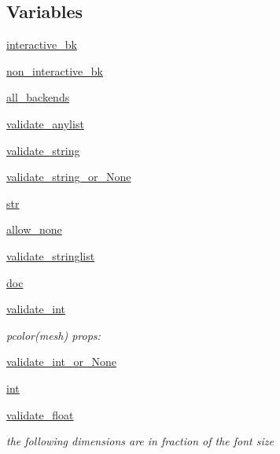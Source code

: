 \subsection*{Variables}
\begin{DoxyCompactItemize}
\item 
\hyperlink{namespacematplotlib_1_1rcsetup_a00b02203e6b65f28d853ecb08f8fc22e}{interactive\+\_\+bk}
\item 
\hyperlink{namespacematplotlib_1_1rcsetup_a661dc21c4d99aca0a22732105f380448}{non\+\_\+interactive\+\_\+bk}
\item 
\hyperlink{namespacematplotlib_1_1rcsetup_a9a69bed08d730abd29bfa11d83e58a4b}{all\+\_\+backends}
\item 
\hyperlink{namespacematplotlib_1_1rcsetup_a60de6b19af83cf4304bc4b23343861e3}{validate\+\_\+anylist}
\item 
\hyperlink{namespacematplotlib_1_1rcsetup_a1f97a3c9d4bd1af2bf559e919b8b0276}{validate\+\_\+string}
\item 
\hyperlink{namespacematplotlib_1_1rcsetup_a9ebdf3d600bf7900130b13110be511f1}{validate\+\_\+string\+\_\+or\+\_\+\+None}
\item 
\hyperlink{namespacematplotlib_1_1rcsetup_aed5b00a21d4268550b723f7bd8e915ae}{str}
\item 
\hyperlink{namespacematplotlib_1_1rcsetup_ac9ce4b2fd2d5b5c60db52f09c2e9bf90}{allow\+\_\+none}
\item 
\hyperlink{namespacematplotlib_1_1rcsetup_ac7243f9af837db13daea1ab5c862b365}{validate\+\_\+stringlist}
\item 
\hyperlink{namespacematplotlib_1_1rcsetup_a33b69dfa9f73796d03f4f5e258f1a779}{doc}
\item 
\hyperlink{namespacematplotlib_1_1rcsetup_a552876eb823b6812452b12cc3e2d12c0}{validate\+\_\+int}
\begin{DoxyCompactList}\small\item\em pcolor(mesh) props\+: \end{DoxyCompactList}\item 
\hyperlink{namespacematplotlib_1_1rcsetup_a626844e9e9ce304357774db16afb6172}{validate\+\_\+int\+\_\+or\+\_\+\+None}
\item 
\hyperlink{namespacematplotlib_1_1rcsetup_a1c2572b75ee5114823c8daebb2ffa098}{int}
\item 
\hyperlink{namespacematplotlib_1_1rcsetup_a01888c8d06fdddbf901fb8575b5151b0}{validate\+\_\+float}
\begin{DoxyCompactList}\small\item\em the following dimensions are in fraction of the font size \end{DoxyCompactList}\item 

\end{DoxyCompactItemize}
